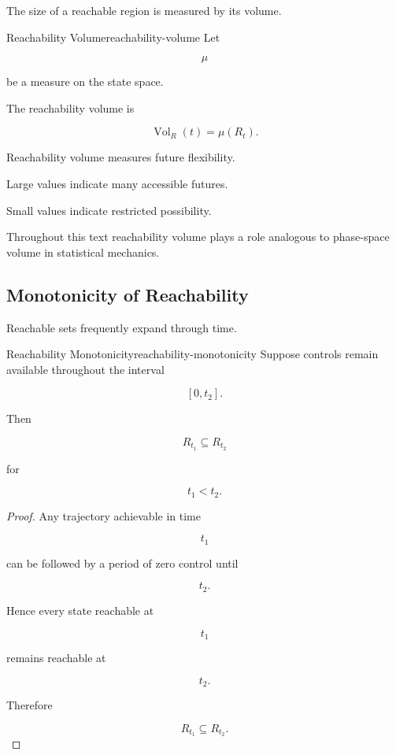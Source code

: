 \documentclass[12pt,twoside,openright]{book}
\newenvironment{rem}
{\begin{remark}{}{}}
{\end{remark}}
\newcommand{\Vol}{\operatorname{Vol}}
\begin{document}
The size of a reachable region is measured by its volume.

\begin{definition}{Reachability Volume}{reachability-volume}
Let

\[
\mu
\]

be a measure on the state space.

The reachability volume is

\[
\Vol_R(t)
=

\mu(R_t).
\]
\end{definition}

Reachability volume measures future flexibility.

Large values indicate many accessible futures.

Small values indicate restricted possibility.

\begin{rem}
Throughout this text reachability volume plays a role
analogous to phase-space volume in statistical mechanics.
\end{rem}

\subsection{Monotonicity of Reachability}

Reachable sets frequently expand through time.

\begin{theorem}{Reachability Monotonicity}{reachability-monotonicity}
Suppose controls remain available throughout the interval

\[
[0,t_2].
\]

Then

\[
R_{t_1}
\subseteq
R_{t_2}
\]

for

\[
t_1<t_2.
\]
\end{theorem}

\begin{proof}
Any trajectory achievable in time

\[
t_1
\]

can be followed by a period of zero control until

\[
t_2.
\]

Hence every state reachable at

\[
t_1
\]

remains reachable at

\[
t_2.
\]

Therefore

\[
R_{t_1}
\subseteq
R_{t_2}.
\]
\end{proof}
\end{document}
